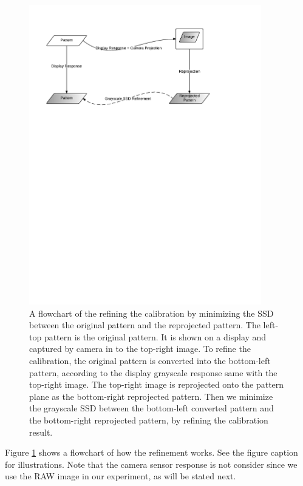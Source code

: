 \documentclass{report}
\begin{document}
\begin{figure}
\centering
\includegraphics[width=0.9\textwidth, trim=0.5in 7in 1.5in 0in, clip=true]{images/render-flow-chart.pdf}
\caption{A flowchart of the refining the calibration by minimizing the SSD between the original pattern and the reprojected pattern. The left-top pattern is the original pattern. It is shown on a display and captured by camera in to the top-right image. To refine the calibration, the original pattern is converted into the bottom-left pattern, according to the display grayscale response same with the top-right image. The top-right image is reprojected onto the pattern plane as the bottom-right reprojected pattern. Then we minimize the grayscale SSD between the bottom-left converted pattern and the bottom-right reprojected pattern, by refining the calibration result. }
\label{displayFlow}
\end{figure}

Figure \ref{displayFlow} shows a flowchart of how the refinement works. See the figure caption for illustrations. Note that the camera sensor response is not consider since we use the RAW image in our experiment, as will be stated next. 
\end{document}
